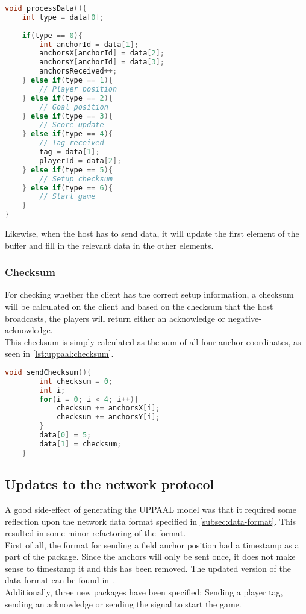 \begin{lstlisting}[caption={Processing Data in UPPAAL model}, captionpos=b,language=C,label={lst:uppaal:processData}]
void processData(){
    int type = data[0];
    
    if(type == 0){
        int anchorId = data[1];
        anchorsX[anchorId] = data[2];
        anchorsY[anchorId] = data[3];
        anchorsReceived++;
    } else if(type == 1){
        // Player position
    } else if(type == 2){
        // Goal position
    } else if(type == 3){
        // Score update
    } else if(type == 4){
        // Tag received
        tag = data[1];
        playerId = data[2];
    } else if(type == 5){
        // Setup checksum
    } else if(type == 6){
        // Start game
    }
}
\end{lstlisting}
\noindent
Likewise, when the host has to send data, it will update the first element of the buffer and fill in the relevant data in the other elements.

\subsubsection{Checksum}
For checking whether the client has the correct setup information, a checksum will be calculated on the client and based on the checksum that the host broadcasts, the players will return either an acknowledge or negative-acknowledge.
\\
This checksum is simply calculated as the sum of all four anchor coordinates, as seen in \autoref{lst:uppaal:checksum}.

\begin{lstlisting}[caption={Calculating checksum in UPPAAL model}, captionpos=b,language=C,label={lst:uppaal:checksum}]
    void sendChecksum(){
        int checksum = 0;
        int i;
        for(i = 0; i < 4; i++){
            checksum += anchorsX[i];
            checksum += anchorsY[i];
        }
        data[0] = 5;
        data[1] = checksum;
    }
\end{lstlisting}

\subsection{Updates to the network protocol}
A good side-effect of generating the UPPAAL model was that it required some reflection upon the network data format specified in \autoref{subsec:data-format}.
This resulted in some minor refactoring of the format.
\\
First of all, the format for sending a field anchor position had a timestamp as a part of the package. 
Since the anchors will only be sent once, it does not make sense to timestamp it and this has been removed.
The updated version of the data format can be found in .
\\
Additionally, three new packages have been specified: Sending a player tag, sending an acknowledge or sending the signal to start the game.

